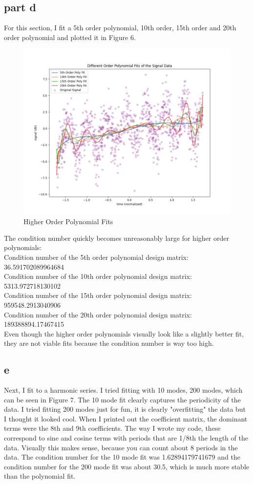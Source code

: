 \documentclass{article}
\begin{document}
\subsection{ part d}
For this section, I fit a 5th order polynomial, 10th order, 15th order and 20th order polynomial and plotted it in Figure 6.

\begin{figure}[t]
    \centering
    \includegraphics[width=0.8\linewidth]{ps5_figs/3d.png}
    \caption{Higher Order Polynomial Fits}
    \label{fig:enter-label}
\end{figure}

The condition number quickly becomes unreasonably large for higher order polynomials: \\
Condition number of the 5th order polynomial design matrix: 36.591702089964684 \\
Condition number of the 10th order polynomial design matrix: 5313.972718130102 \\
Condition number of the 15th order polynomial design matrix: 959548.2913040906 \\
Condition number of the 20th order polynomial design matrix: 189388894.17467415\\


Even though the higher order polynomials visually look like a slightly better fit, they are not viable fits because the condition number is way too high. 

\subsection{e}

Next, I fit to a harmonic series. I tried fitting with 10 modes, 200 modes, which can be seen in Figure 7. The 10 mode fit clearly captures the periodicity of the data. I tried fitting 200 modes just for fun, it is clearly "overfitting" the data but I thought it looked cool. When I printed out the coefficient matrix, the dominant terms were the 8th and 9th coefficients. The way I wrote my code, these correspond to sine and cosine terms with periods that are 1/8th the length of the data. Visually this makes sense, because you can count about 8 periods in the data. The condition number for the 10 mode fit was 1.62894179741679 and the condition number for the 200 mode fit was about 30.5, which is much more stable than the polynomial fit.
\end{document}
